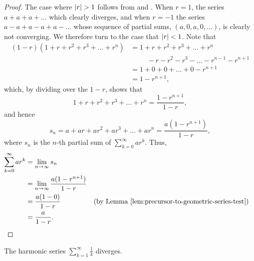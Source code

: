 \begin{proof}
  The case where $| r | > 1$ follows from
   and
  . When $r = 1$, the
  series $a + a + a + \dots$ which clearly diverges, and when $r =
  -1$ the series $a - a + a - a + a - \dots$ whose sequence of
  partial sums, $(a, 0, a, 0, \dots)$, is clearly not converging. We
  therefore turn to the case that $| r | < 1$. Note that
  \begin{align*}
    (1 - r) (1 + r + r^2 + r^3 + \dots + r^n) & = 1 + r + r^2 + r^3 +
    \dots + r^n \\
    & \phantom{=} \:\:\:\:\, - r - r^2 - r^3 - \dots - r^{n - 1} -
    r^{n + 1} \\
    & = 1 + 0 + 0 + \dots + 0 - r^{n + 1} \\
    & = 1 - r^{n + 1},
  \end{align*}
  which, by dividing over the $1 - r$, shows that
  \[ 1 + r + r^2 + r^3 + \dots + r^n = \frac{1 - r^{n + 1}}{1 - r}, \]
  and hence
  \[ s_n = a + ar + ar^2 + ar^3 + \dots + ar^n = \frac{a(1 - r^{n +
  1})}{1 - r}, \]
  where $s_n$ is the $n$-th partial sum of $\sum_{k = 0}^{\infty} ar^k$. Thus,
  \begin{align*}
    \sum_{k = 0}^{\infty} ar^k & = \lim_{n \to \infty} s_n \\
    & = \lim_{n \to \infty} \frac{a(1 - r^{n + 1})}{1 - r} \\
    & = \frac{a(1 - 0)}{1 - r} && \text{(by
    \lemref{precursor-to-geometric-series-test})} \\
    & = \frac{a}{1 - r}.
  \end{align*}
\end{proof}

\begin{proposition}
  The harmonic series $\sum_{k = 1}^{\infty} \frac{1}{k}$ diverges.
\end{proposition}

